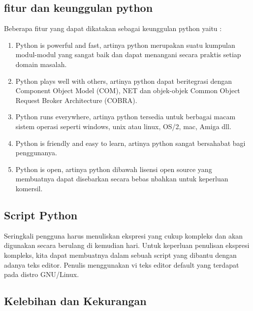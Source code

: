 \subsection{fitur dan keunggulan python}
Beberapa fitur yang dapat dikatakan sebagai keunggulan python yaitu :
\begin{enumerate}
\item Python is powerful and fast, artinya python merupakan suatu kumpulan modul-modul yang sangat baik  dan dapat menangani secara praktis setiap domain masalah.
\item Python plays well with others, artinya python dapat beritegrasi dengan Component Object Model (COM), NET dan objek-objek Common Object Request Broker Architecture (COBRA).
\item Python runs everywhere, artinya python tersedia untuk berbagai macam sistem operasi seperti windows, unix atau linux, OS/2, mac, Amiga dll.
\item Python is friendly and easy to learn, artinya python sangat bersahabat bagi penggunanya.
\item Python is open, artinya python dibawah lisensi open source yang membuatnya dapat disebarkan secara bebas nbahkan untuk keperluan komersil.
\end{enumerate}

\subsection{Script Python}
    Seringkali pengguna harus menuliskan ekspresi yang cukup kompleks dan akan digunakan secara berulang di kemudian hari. Untuk keperluan penulisan ekspresi kompleks, kita dapat membuatnya dalam sebuah script yang dibantu dengan adanya teks editor. Penulis menggunakan vi teks editor default yang terdapat pada distro GNU/Linux.

\subsection{Kelebihan dan Kekurangan}
